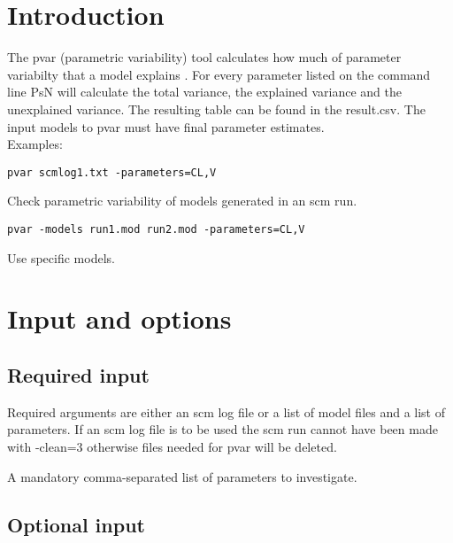 

\newcommand{\guidetoolname}{pvar}



\maketitle


\section{Introduction}
The pvar (parametric variability) tool calculates how much of parameter variabilty that a model explains \cite{Hennig}. For every parameter listed on the command line PsN will calculate the total variance, the explained variance and the unexplained variance. The resulting table can be found in the result.csv. The input models to pvar must have final parameter estimates.\\
Examples:
\begin{verbatim}
pvar scmlog1.txt -parameters=CL,V
\end{verbatim}
Check parametric variability of models generated in an scm run.
\begin{verbatim}
pvar -models run1.mod run2.mod -parameters=CL,V
\end{verbatim}
Use specific models.
\section{Input and options}

\subsection{Required input}
Required arguments are either an scm log file or a list of model files and a list of parameters. If an scm log file is to be used the scm run cannot have been made with -clean=3 otherwise files needed for pvar will be deleted.

\begin{optionlist}
A mandatory comma-separated list of parameters to investigate.
\nextopt
\end{optionlist}

\subsection{Optional input}

